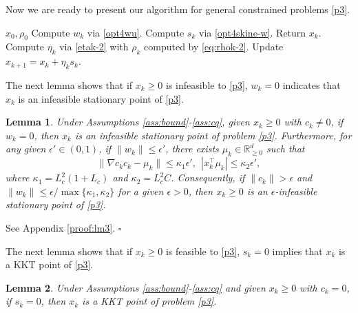 \documentclass[11pt]{article}
\newenvironment{proof}{{\noindent\it Proof.}\quad}{\hfill $\square$\par}
\newcommand{\R}{\mathbb{R}}
\newtheorem{lemma}{Lemma}
\begin{document}
Now we are ready to present our algorithm for general constrained problems \eqref{p3}.

\begin{algorithm}[H]
  \caption{Adaptive directional decomposition method for \eqref{p3}} 
  \label{alg3}
  \begin{algorithmic}[1] 
    \REQUIRE \(x_0, \rho_0\)
    \STATE Compute $w_k$ via  \eqref{opt4wu}. 
    \STATE Compute \(s_k\) via \eqref{opt4skine-w}. %
        \STATE Return \(x_k\).
    \ELSE
        \STATE Compute \(\eta_k\) via \eqref{etak-2} {with \(\rho_k\) computed by \eqref{eq:rhok-2}}.
        \STATE Update \(x_{k+1} = x_k + \eta_k s_k\).
    \ENDIF
    \ENDFOR 
  \end{algorithmic} 
\end{algorithm}

The next lemma shows that if  $x_k\ge0$ is infeasible to \eqref{p3}, $w_k=0$ indicates that $x_k$ is an infeasible  stationary point of \eqref{p3}.%
\begin{lemma}\label{lm:infeasibility}
    Under Assumptions \ref{ass:bound}-\ref{ass:cq}, given \(x_k \geq 0\) with $c_k\neq 0$,  if  \(w_k = 0\), then \(x_k\) is  an infeasible stationary point of problem \eqref{p3}. Furthermore, for any given \(\epsilon' \in (0,1)\), if \(\|w_k\|\leq \epsilon'\), there exists \(\mu_k \in \R^d_{\ge 0}\) such that
    \[
    \|\nabla c_k c_k - \mu_k\| \leq \kappa_1 \epsilon',~~|x_k^\top \mu_k| \leq \kappa_2 \epsilon',
    \]
    where \(\kappa_1 = L_c^2(1+L_c)\) and {\(\kappa_2 =  L_c^2 C\)}. Consequently,  if $\|c_k\|>\epsilon$ and $\|w_k\| \le \epsilon/\max\{\kappa_1,\kappa_2\}$ for a given $\epsilon>0$, then $x_k\ge0$ is an $\epsilon$-infeasible stationary point of \eqref{p3}.
\end{lemma}
\begin{proof}
    See Appendix \ref{proof:lm3}.
\end{proof}



The next lemma shows that if $x_k\ge0$ is feasible to \eqref{p3}, $s_k=0$ implies that $x_k$ is a KKT point of \eqref{p3}.
\begin{lemma}\label{lm:s0}
    Under Assumptions \ref{ass:bound}-\ref{ass:cq} and  given \(x_k \geq 0\) with $c_k = 0$,  if  \(s_k = 0\), then \(x_k\) is a KKT point of problem \eqref{p3}. 
\end{lemma}
\end{document}
